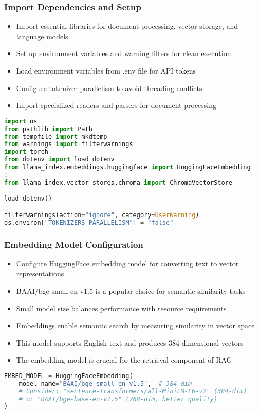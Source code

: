 \begin{frame}[fragile]\frametitle{Import Dependencies and Setup}
      \begin{itemize}
          \item Import essential libraries for document processing, vector storage, and language models
          \item Set up environment variables and warning filters for clean execution
          \item Load environment variables from .env file for API tokens
          \item Configure tokenizer parallelism to avoid threading conflicts
          \item Import specialized readers and parsers for document processing
      \end{itemize}
      
\begin{lstlisting}[language=Python, basicstyle=\tiny]
import os
from pathlib import Path
from tempfile import mkdtemp
from warnings import filterwarnings
import torch
from dotenv import load_dotenv
from llama_index.embeddings.huggingface import HuggingFaceEmbedding
:
from llama_index.vector_stores.chroma import ChromaVectorStore

load_dotenv()

filterwarnings(action="ignore", category=UserWarning)
os.environ["TOKENIZERS_PARALLELISM"] = "false"
\end{lstlisting}
\end{frame}

\begin{frame}[fragile]\frametitle{Embedding Model Configuration}
      \begin{itemize}
          \item Configure HuggingFace embedding model for converting text to vector representations
          \item BAAI/bge-small-en-v1.5 is a popular choice for semantic similarity tasks
          \item Small model size balances performance with resource requirements
          \item Embeddings enable semantic search by measuring similarity in vector space
          \item This model supports English text and produces 384-dimensional vectors
          \item The embedding model is crucial for the retrieval component of RAG
      \end{itemize}
      
\begin{lstlisting}[language=Python, basicstyle=\tiny]
EMBED_MODEL = HuggingFaceEmbedding(
    model_name="BAAI/bge-small-en-v1.5",  # 384-dim
    # Consider: "sentence-transformers/all-MiniLM-L6-v2" (384-dim)
    # or "BAAI/bge-base-en-v1.5" (768-dim, better quality)
)
\end{lstlisting}
\end{frame}

